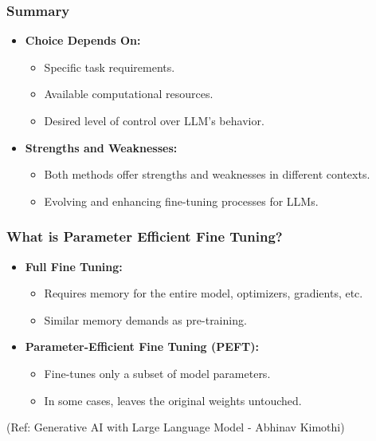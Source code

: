 \begin{frame}[fragile]\frametitle{Summary}
  \begin{itemize}
    \item \textbf{Choice Depends On:}
      \begin{itemize}
        \item Specific task requirements.
        \item Available computational resources.
        \item Desired level of control over LLM's behavior.
      \end{itemize}
    \item \textbf{Strengths and Weaknesses:}
      \begin{itemize}
        \item Both methods offer strengths and weaknesses in different contexts.
        \item Evolving and enhancing fine-tuning processes for LLMs.
      \end{itemize}
  \end{itemize}
\end{frame}


\begin{frame}[fragile]\frametitle{What is Parameter Efficient Fine Tuning?}

\begin{itemize}
  \item \textbf{Full Fine Tuning:}
    \begin{itemize}
      \item Requires memory for the entire model, optimizers, gradients, etc.
      \item Similar memory demands as pre-training.
    \end{itemize}

  \item \textbf{Parameter-Efficient Fine Tuning (PEFT):}
    \begin{itemize}
      \item Fine-tunes only a subset of model parameters.
      \item In some cases, leaves the original weights untouched.
    \end{itemize}
\end{itemize}


{\tiny (Ref: Generative AI with Large Language Model - Abhinav  Kimothi)}

\end{frame}


